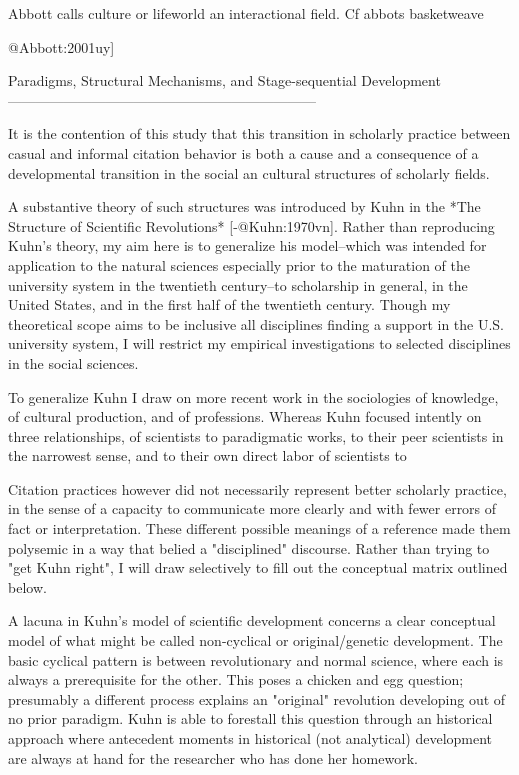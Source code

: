Abbott calls culture or lifeworld an interactional field. Cf abbots
basketweave

@Abbott:2001uy]

Paradigms, Structural Mechanisms, and Stage-sequential Development
------------------------------------------------------------------

It is the contention of this study that this transition in scholarly
practice between casual and informal citation behavior is both a cause
and a consequence of a developmental transition in the social an
cultural structures of scholarly fields.

A substantive theory of such structures was introduced by Kuhn in the
*The Structure of Scientific Revolutions* [-@Kuhn:1970vn]. Rather than
reproducing Kuhn's theory, my aim here is to generalize his model--which
was intended for application to the natural sciences especially prior to
the maturation of the university system in the twentieth century--to
scholarship in general, in the United States, and in the first half of
the twentieth century. Though my theoretical scope aims to be inclusive
all disciplines finding a support in the U.S. university system, I will
restrict my empirical investigations to selected disciplines in the
social sciences.

To generalize Kuhn I draw on more recent work in the sociologies of
knowledge, of cultural production, and of professions. Whereas Kuhn
focused intently on three relationships, of scientists to paradigmatic
works, to their peer scientists in the narrowest sense, and to their own
direct labor of scientists to

Citation practices however did not necessarily represent better
scholarly practice, in the sense of a capacity to communicate more
clearly and with fewer errors of fact or interpretation. These different
possible meanings of a reference made them polysemic in a way that
belied a "disciplined" discourse. Rather than trying to "get Kuhn
right", I will draw selectively to fill out the conceptual matrix
outlined below.

A lacuna in Kuhn's model of scientific development concerns a clear
conceptual model of what might be called non-cyclical or
original/genetic development. The basic cyclical pattern is between
revolutionary and normal science, where each is always a prerequisite
for the other. This poses a chicken and egg question; presumably a
different process explains an "original" revolution developing out of no
prior paradigm. Kuhn is able to forestall this question through an
historical approach where antecedent moments in historical (not
analytical) development are always at hand for the researcher who has
done her homework.

